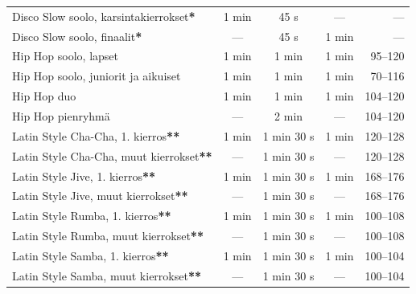 \documentclass[12pt, a4paper, oneside]{article}
\begin{document}
\begin{table}[ht]
\begin{tabular}{@{\hspace{0.25cm}}lcccr@{\hspace{0.25cm}}}
        Disco Slow soolo, karsintakierrokset\textbf{*}  & 1 min               & 45 s                   & ---                    & ---            \\
        Disco Slow soolo, finaalit\textbf{*}            & ---                 & 45 s                   & 1 min                  & ---            \\ \midrule
        Hip Hop soolo, lapset                           & 1 min               & 1 min                  & 1 min                  & 95--120        \\
        Hip Hop soolo, juniorit ja aikuiset             & 1 min               & 1 min                  & 1 min                  & 70--116        \\
        Hip Hop duo                                     & 1 min               & 1 min                  & 1 min                  & 104--120       \\
        Hip Hop pienryhmä                               & ---                 & 2 min                  & ---                    & 104--120       \\ \midrule
        Latin Style Cha-Cha, 1. kierros\textbf{**}      & 1 min               & 1 min 30 s             & 1 min                  & 120--128       \\
        Latin Style Cha-Cha, muut kierrokset\textbf{**} & ---                 & 1 min 30 s             & ---                    & 120--128       \\
        Latin Style Jive, 1. kierros\textbf{**}         & 1 min               & 1 min 30 s             & 1 min                  & 168--176       \\
        Latin Style Jive, muut kierrokset\textbf{**}    & ---                 & 1 min 30 s             & ---                    & 168--176       \\
        Latin Style Rumba, 1. kierros\textbf{**}        & 1 min               & 1 min 30 s             & 1 min                  & 100--108       \\
        Latin Style Rumba, muut kierrokset\textbf{**}   & ---                 & 1 min 30 s             & ---                    & 100--108       \\
        Latin Style Samba, 1. kierros\textbf{**}        & 1 min               & 1 min 30 s             & 1 min                  & 100--104       \\
        Latin Style Samba, muut kierrokset\textbf{**}   & ---                 & 1 min 30 s             & ---                    & 100--104       \\ \bottomrule
    \end{tabular}
    \label{tab:bpm-rajat}
\end{table}
\end{document}

